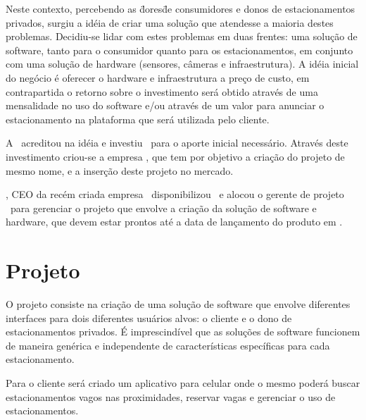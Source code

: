 Neste contexto, percebendo as \"dores\" de consumidores e donos de estacionamentos privados, surgiu a idéia de criar uma solução que atendesse a maioria destes problemas. Decidiu-se lidar com estes problemas em duas frentes: uma solução de software, tanto para o consumidor quanto para os estacionamentos, em conjunto com uma solução de hardware (sensores, câmeras e infraestrutura). A idéia inicial do negócio é oferecer o hardware e infraestrutura a preço de custo, em contrapartida o retorno sobre o investimento será obtido através de uma mensalidade no uso do software e/ou através de um valor para anunciar o estacionamento na plataforma que será utilizada pelo cliente.

A \investorCompanyName\ acreditou na idéia e investiu \ventureBudget\ para o aporte inicial necessário. Através deste investimento criou-se a empresa \startupCompanyName, que tem por objetivo a criação do projeto de mesmo nome, e a inserção deste projeto no mercado.

\ceoName, CEO da recém criada empresa \startupCompanyName\, disponibilizou \maximumBudget\ e alocou o gerente de projeto \projectManagerName\ para gerenciar o projeto que envolve a criação da solução de software e hardware, que devem estar prontos até a data de lançamento do produto em \maximumDeadline.



\section{Projeto}

O projeto consiste na criação de uma solução de software que envolve diferentes interfaces para dois diferentes usuários alvos: o cliente e o dono de estacionamentos privados. É imprescindível que as soluções de software funcionem de maneira genérica e independente de características específicas para cada estacionamento. 

Para o cliente será criado um aplicativo para celular onde o mesmo poderá buscar estacionamentos vagos nas proximidades, reservar vagas e gerenciar o uso de estacionamentos.

